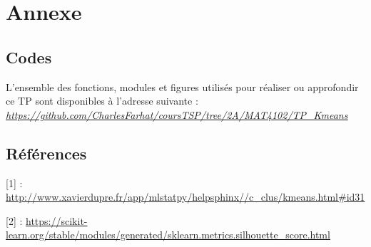 \documentclass{article}
\begin{document}
\section{Annexe}

\subsection{Codes}
L'ensemble des fonctions, modules et figures utilisés pour réaliser ou approfondir ce TP sont disponibles à l'adresse suivante : \href{https://github.com/CharlesFarhat/coursTSP/tree/2A/MAT4102/TP_Kmeans}{\underline{\textit{https://github.com/CharlesFarhat/coursTSP/tree/2A/MAT4102/TP\_Kmeans}}}

\subsection{Références}

[1] : \url{http://www.xavierdupre.fr/app/mlstatpy/helpsphinx//c_clus/kmeans.html#id31}

[2] : \url{https://scikit-learn.org/stable/modules/generated/sklearn.metrics.silhouette_score.html}
\end{document}
